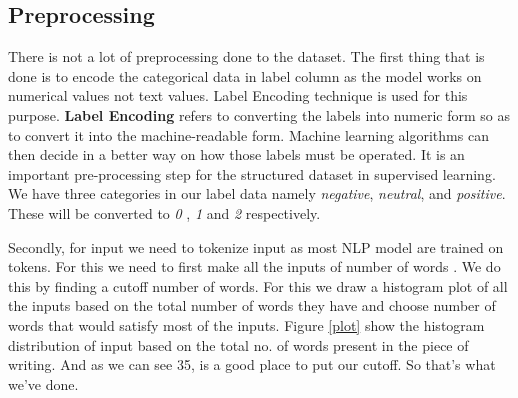 \documentclass[a4paper, 12pt]{article}
\begin{document}
\begin{sloppypar}
 \subsection{Preprocessing}
 
 There is not a lot of preprocessing done to the dataset. The first thing that is done is to encode the categorical data in label column as the model works on numerical values not text values. Label Encoding technique is used for this purpose. \textbf{Label Encoding} refers to converting the labels into numeric form so as to convert it into the machine-readable form. Machine learning algorithms can then decide in a better way on how those labels must be operated. It is an important pre-processing step for the structured dataset in supervised learning.\cite{noauthor_ml_2018}
 We have three categories in our label data namely \textit{negative}, \textit{neutral}, and \textit{positive}. These will be converted to \textit{0} , \textit{1} and \textit{2} respectively.
 
 Secondly, for input we need to tokenize input as most NLP model are trained on tokens. For this we need to first make all the inputs of number of words . We do this by finding a cutoff number of words. For this we draw a histogram plot of all the inputs based on the total number of words they have and choose number of words that would satisfy most of the inputs. Figure \ref{plot} show the histogram distribution of input based on the total no. of words present in the piece of writing. And as we can see 35, is a good place to put our  cutoff. So that's what we've done. 
 

\end{sloppypar}
\end{document}

